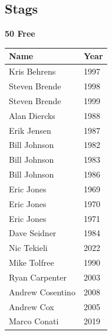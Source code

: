 \subsection{Stags}
\vspace{1.2em}
\noindent\begin{minipage}[t]{0.48\textwidth}
\centering
\textbf{\textcolor{teamprimary}{50 Free}}\par
\vspace{0.5em}
\centering
\small
\renewcommand{\arraystretch}{1.0}
\setlength{\tabcolsep}{4pt}
\begin{tabular}{@{}p{3.0cm}p{1.0cm}@{}}
\toprule
\textbf{Name} & \textbf{Year} \\
\midrule
Kris Behrens & 1997 \\
Steven Brende & 1998 \\
Steven Brende & 1999 \\
Alan Diercks & 1988 \\
Erik Jensen & 1987 \\
Bill Johnson & 1982 \\
Bill Johnson & 1983 \\
Bill Johnson & 1986 \\
Eric Jones & 1969 \\
Eric Jones & 1970 \\
Eric Jones & 1971 \\
Dave Seidner & 1984 \\
Nic Tekieli & 2022 \\
Mike Tolfree & 1990 \\
Ryan Carpenter & 2003 \\
Andrew Cosentino & 2008 \\
Andrew Cox & 2005 \\
Marco Conati & 2019 \\
\bottomrule
\end{tabular}
\end{minipage}
\hfill
